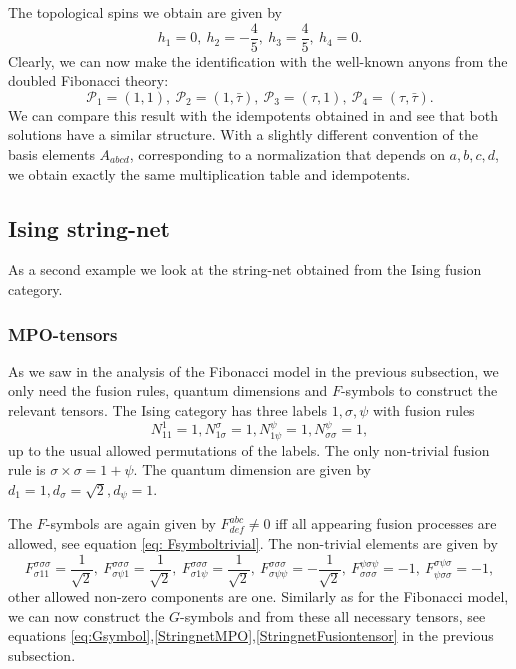 \documentclass[12 pt]{article}
\begin{document}
The topological spins we obtain are given by
$$
h_1=0,\: h_2=-\frac{4}{5},\: h_3=\frac{4}{5},\: h_4=0.
$$
Clearly, we can now make the identification with the well-known anyons from the doubled Fibonacci theory:
$$\mathcal{P}_1=(1,1),\: \mathcal{P}_2=(1,\bar{\tau}),\: \mathcal{P}_3=(\tau,1),\: \mathcal{P}_4=(\tau,\bar{\tau}).$$
We can compare this result with the idempotents obtained in \cite{Qalgebra} and see that both solutions have a similar structure. With a slightly different convention of the basis elements $A_{abcd}$, corresponding to a normalization that depends on $a,b,c,d$, we obtain exactly the same multiplication table and idempotents.

\subsection{Ising string-net}
As a second example we look at the string-net obtained from the Ising fusion category.
\subsubsection{MPO-tensors}
As we saw in the analysis of the Fibonacci model in the previous subsection, we only need the fusion rules, quantum dimensions and $F$-symbols to construct the relevant tensors. The Ising category has three labels $1,\sigma,\psi$ with fusion rules
$$
N_{11}^1=1, N_{1\sigma}^{\sigma}=1, N_{1\psi}^{\psi}=1, N_{\sigma \sigma}^{\psi}=1,
$$
up to the usual allowed permutations of the labels. The only non-trivial fusion rule is $\sigma \times \sigma = 1 + \psi$. The quantum dimension are given by $d_1=1, d_{\sigma}=\sqrt{2}, d_{\psi}=1$.

The $F$-symbols are again given by $F^{abc}_{def}\neq 0$ iff all appearing fusion processes are allowed, see equation \eqref{eq: Fsymboltrivial}. The non-trivial elements are given by
$$
F^{\sigma\sigma\sigma}_{\sigma 1 1}=\frac{1}{\sqrt{2}},\:
F^{\sigma\sigma\sigma}_{\sigma \psi 1}=\frac{1}{\sqrt{2}},\:
F^{\sigma\sigma\sigma}_{\sigma 1 \psi}=\frac{1}{\sqrt{2}},\:
F^{\sigma\sigma\sigma}_{\sigma \psi \psi}=-\frac{1}{\sqrt{2}},\:
F^{\psi \sigma \psi}_{\sigma \sigma \sigma}=-1, \:
F^{\sigma \psi \sigma}_{\psi \sigma \sigma}=-1,
$$
other allowed non-zero components are one. Similarly as for the Fibonacci model, we can now construct the $G$-symbols and from these all necessary tensors, see equations \eqref{eq:Gsymbol},\eqref{StringnetMPO},\eqref{StringnetFusiontensor} in the previous subsection.
\end{document}
